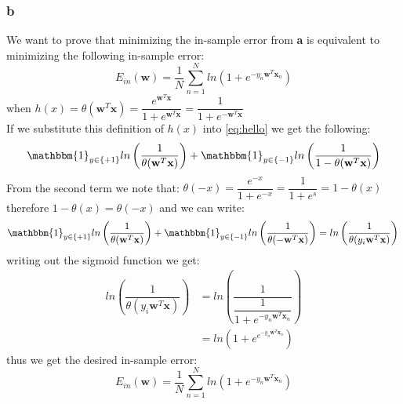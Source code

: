 \documentclass{article}
\begin{document}
\subsubsection{b}
We want to prove that minimizing the in-sample error from \textbf{a} is equivalent to minimizing the following in-sample error:
\begin{equation*}
E_{in}(\mathbf{w}) = \dfrac{1}{N} \sum\limits_{n=1}^N ln \left(1+e^{-y_n \mathbf{w}^T \mathbf{x}_n} \right)
\end{equation*}
when $h(x)= \theta(\mathbf{w}^T\mathbf{x})= \dfrac{e^{\mathbf{w}^T\mathbf{x}}}{1+e^{\mathbf{w}^T\mathbf{x}}} =
\dfrac{1}{1+e^{-\mathbf{w}^T\mathbf{x}}}$ \\
If we substitute this definition of $h(x)$ into \eqref{eq:hello} we get the following:
\begin{equation*}
\mathbbm{1}_{y \in \left\{ +1 \right\}} ln \left(\dfrac{1}{\theta(\mathbf{w}^T\mathbf{x})}\right) + \mathbbm{1}_{y \in \left\{ -1 \right\}} ln \left(\dfrac{1}{1-\theta(\mathbf{w}^T\mathbf{x})} \right)
\end{equation*}
From the second term we note that:
$ \theta (-x) = \dfrac{e^{-x}}{1+e^{-x}}= \dfrac{1}{1+e^s} = 1 - \theta(x) $ therefore $1 - \theta(x) = \theta(-x)$ and we can write:
\begin{equation*}
\mathbbm{1}_{y \in \left\{ +1 \right\}} ln \left(\dfrac{1}{\theta(\mathbf{w}^T\mathbf{x})}\right) + \mathbbm{1}_{y \in \left\{ -1 \right\}} ln \left(\dfrac{1}{\theta(-\mathbf{w}^T\mathbf{x})} \right) =
ln \left( \dfrac{1}{\theta(y_i \mathbf{w}^T\mathbf{x})}\right) \\
\end{equation*}
writing out the sigmoid function we get:
\begin{align*}
ln \left( \dfrac{1}{\theta(y_i \mathbf{w}^T\mathbf{x})}\right) &=
ln \left(  \dfrac{1}{\dfrac{1}{1+e^{-y_n \mathbf{w}^T \mathbf{x}_n}} } \right) \\
&= ln \left( 1 + e^{e^{-y_n \mathbf{w}^T \mathbf{x}_n}} \right)
\end{align*}
thus we get the desired in-sample error:
\begin{equation*}
E_{in}(\mathbf{w}) = \dfrac{1}{N} \sum\limits_{n=1}^N ln \left(1+e^{-y_n \mathbf{w}^T \mathbf{x}_n} \right)
\end{equation*}
\end{document}
